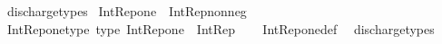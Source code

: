 \begin{isabellebody}
\ discharge{\isacharunderscore}{\kern0pt}types%
\endisatagproof
{\isafoldproof}%
%
\isadelimproof
\isanewline
%
\endisadelimproof
\isanewline
{}\isamarkupfalse%
\ {\isachardoublequoteopen}Int{\isacharunderscore}{\kern0pt}Rep{\isacharunderscore}{\kern0pt}one\ {\isasymequiv}\ Int{\isacharunderscore}{\kern0pt}Rep{\isacharunderscore}{\kern0pt}nonneg\ {}{\isachardoublequoteclose}\isanewline
\isanewline
{}\isamarkupfalse%
\ Int{\isacharunderscore}{\kern0pt}Rep{\isacharunderscore}{\kern0pt}one{\isacharunderscore}{\kern0pt}type\ {\isacharbrackleft}{\kern0pt}type{\isacharbrackright}{\kern0pt}{\isacharcolon}{\kern0pt}\ {\isachardoublequoteopen}Int{\isacharunderscore}{\kern0pt}Rep{\isacharunderscore}{\kern0pt}one\ {\isacharcolon}{\kern0pt}\ Int{\isacharunderscore}{\kern0pt}Rep{\isachardoublequoteclose}\isanewline
%
\isadelimproof
\ \ %
\endisadelimproof
%
\isatagproof
{}\isamarkupfalse%
\ Int{\isacharunderscore}{\kern0pt}Rep{\isacharunderscore}{\kern0pt}one{\isacharunderscore}{\kern0pt}def\ \isamarkupfalse%
\ discharge{\isacharunderscore}{\kern0pt}types%
\endisatagproof
{\isafoldproof}%
%
\isadelimproof
\isanewline
%
\endisadelimproof
\isanewline
%
\isadelimtheory
\isanewline
%
\endisadelimtheory
%
\isatagtheory
{}\isamarkupfalse%
%
\endisatagtheory
{\isafoldtheory}%
%
\isadelimtheory
%
\endisadelimtheory
%
\end{isabellebody}%
\endinput
